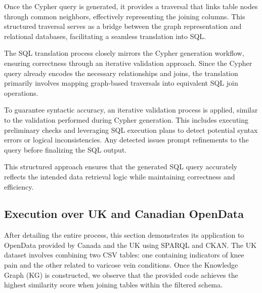 Once the Cypher query is generated, it provides a traversal that links table nodes through common neighbors, effectively representing the joining columns. This structured traversal serves as a bridge between the graph representation and relational databases, facilitating a seamless translation into SQL.

The SQL translation process closely mirrors the Cypher generation workflow, ensuring correctness through an iterative validation approach. Since the Cypher query already encodes the necessary relationships and joins, the translation primarily involves mapping graph-based traversals into equivalent SQL join operations. 

To guarantee syntactic accuracy, an iterative validation process is applied, similar to the validation performed during Cypher generation. This includes executing preliminary checks and leveraging SQL execution plans to detect potential syntax errors or logical inconsistencies. Any detected issues prompt refinements to the query before finalizing the SQL output. 

This structured approach ensures that the generated SQL query accurately reflects the intended data retrieval logic while maintaining correctness and efficiency.


\subsection{Execution over UK and Canadian OpenData}

After detailing the entire process, this section demonstrates its application to OpenData provided by Canada and the UK using SPARQL and CKAN. The UK dataset involves combining two CSV tables: one containing indicators of knee pain and the other related to varicose vein conditions. Once the Knowledge Graph (KG) is constructed, we observe that the provided code achieves the highest similarity score when joining tables within the filtered schema.


